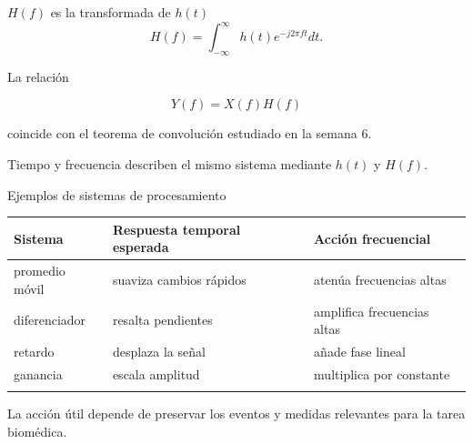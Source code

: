 \documentclass[
  ignorenonframetext,
  aspectratio=169,
  spanish,
]{beamer}
\newcounter{none} %
\begin{document}
\begin{frame}{\(H(f)\) es la transformada de \(h(t)\)}
  \protect{}\label{hf-es-la-transformada-de-ht}
  \[H(f)=\int_{-\infty}^{\infty}h(t)e^{-j2\pi ft}dt.\]

  La relación

  \[Y(f)=X(f)H(f)\]

  coincide con el teorema de convolución estudiado en la semana 6.

  \begin{tcolorbox}[enhanced jigsaw, arc=.35mm, bottomrule=.15mm, bottomtitle=1mm, breakable, colback=white, colbacktitle=quarto-callout-tip-color!10!white, colframe=quarto-callout-tip-color-frame, coltitle=black, left=2mm, leftrule=.75mm, opacityback=0, opacitybacktitle=0.6, rightrule=.15mm, title=\textcolor{quarto-callout-tip-color}{\faLightbulb}\hspace{0.5em}{Tip}, titlerule=0mm, toprule=.15mm, toptitle=1mm]

    Tiempo y frecuencia describen el mismo sistema mediante \(h(t)\) y
    \(H(f)\).

  \end{tcolorbox}
\end{frame}

\begin{frame}{Ejemplos de sistemas de procesamiento}
  \protect{}\label{ejemplos-de-sistemas-de-procesamiento}
  {\def\LTcaptype{none} %
    \begin{longtable}[]{@{}lll@{}}
      \toprule\noalign{}
      Sistema        & Respuesta temporal esperada & Acción frecuencial          \\
      \midrule\noalign{}
      \endhead
      promedio móvil & suaviza cambios rápidos     & atenúa frecuencias altas    \\
      diferenciador  & resalta pendientes          & amplifica frecuencias altas \\
      retardo        & desplaza la señal           & añade fase lineal           \\
      ganancia       & escala amplitud             & multiplica por constante    \\
      \bottomrule\noalign{}
    \end{longtable}
  }

  \begin{tcolorbox}[enhanced jigsaw, arc=.35mm, bottomrule=.15mm, bottomtitle=1mm, breakable, colback=white, colbacktitle=quarto-callout-warning-color!10!white, colframe=quarto-callout-warning-color-frame, coltitle=black, left=2mm, leftrule=.75mm, opacityback=0, opacitybacktitle=0.6, rightrule=.15mm, title=\textcolor{quarto-callout-warning-color}{\faExclamationTriangle}\hspace{0.5em}{Advertencia}, titlerule=0mm, toprule=.15mm, toptitle=1mm]

    La acción útil depende de preservar los eventos y medidas relevantes
    para la tarea biomédica.

  \end{tcolorbox}
\end{frame}
\end{document}
